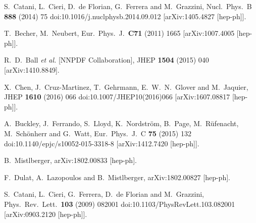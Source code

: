 \documentclass[12pt]{article}
\begin{document}
\begin{thebibliography}{99}
  S.~Catani, L.~Cieri, D.~de Florian, G.~Ferrera and M.~Grazzini,
  Nucl.\ Phys.\ B {\bf 888} (2014) 75
  doi:10.1016/j.nuclphysb.2014.09.012
  [arXiv:1405.4827 [hep-ph]].
  

  T.~Becher, M.~Neubert,
  Eur.\ Phys.\ J.\  {\bf C71 } (2011)  1665
[arXiv:1007.4005 [hep-ph]].

   R.~D.~Ball {\it et al.} [NNPDF Collaboration],
  JHEP {\bf 1504} (2015) 040
  [arXiv:1410.8849].
  
  X.~Chen, J.~Cruz-Martinez, T.~Gehrmann, E.~W.~N.~Glover and M.~Jaquier,
  JHEP {\bf 1610} (2016) 066
  doi:10.1007/JHEP10(2016)066
  [arXiv:1607.08817 [hep-ph]].
  
  A.~Buckley, J.~Ferrando, S.~Lloyd, K.~Nordström, B.~Page, M.~Rüfenacht, M.~Schönherr and G.~Watt,
  Eur.\ Phys.\ J.\ C {\bf 75} (2015) 132
  doi:10.1140/epjc/s10052-015-3318-8
  [arXiv:1412.7420 [hep-ph]].


  B.~Mistlberger,
  arXiv:1802.00833 [hep-ph].

  F.~Dulat, A.~Lazopoulos and B.~Mistlberger,
  arXiv:1802.00827 [hep-ph].
  
  S.~Catani, L.~Cieri, G.~Ferrera, D.~de Florian and M.~Grazzini,
  Phys.\ Rev.\ Lett.\  {\bf 103} (2009) 082001
  doi:10.1103/PhysRevLett.103.082001
  [arXiv:0903.2120 [hep-ph]].


\end{thebibliography}
\end{document}
